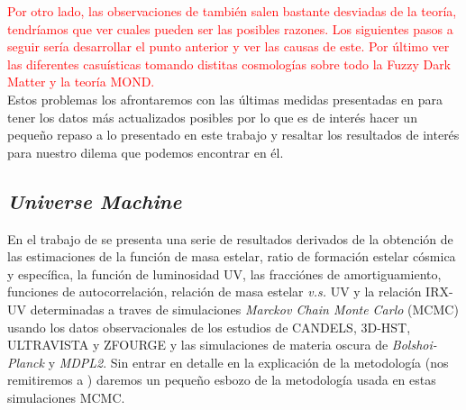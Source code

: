 \textcolor{red}{Por otro lado, las observaciones de \cite{hildebrandt2009cars} también salen bastante desviadas de la teoría, tendríamos que ver cuales pueden ser las posibles razones. Los siguientes pasos a seguir sería desarrollar el punto anterior y ver las causas de este. Por último ver las diferentes casuísticas tomando distitas cosmologías sobre todo la Fuzzy Dark Matter y la teoría MOND.}\\

Estos problemas los afrontaremos con las últimas medidas presentadas en \cite{behroozi2019universemachine} para tener los datos más actualizados posibles por lo que es de interés hacer un pequeño repaso a lo presentado en este trabajo y resaltar los resultados de interés para nuestro dilema que podemos encontrar en él.

\subsection{\textit{Universe Machine}}

En el trabajo de \cite{behroozi2019universemachine} se presenta una serie de resultados derivados de la obtención de las estimaciones de la función de masa estelar, ratio de formación estelar cósmica y específica, la función de luminosidad UV, las fracciónes de amortiguamiento, funciones de autocorrelación, relación de masa estelar \textit{v.s.} UV y la relación IRX-UV determinadas a traves de simulaciones \textit{Marckov Chain Monte Carlo} (MCMC) usando los datos observacionales de los estudios de CANDELS, 3D-HST, ULTRAVISTA y ZFOURGE y las simulaciones de materia oscura de \textit{Bolshoi-Planck} y \textit{MDPL2}. Sin entrar en detalle en la explicación de la metodología (nos remitiremos a \cite{behroozi2019universemachine}) daremos un pequeño esbozo de la metodología usada en estas simulaciones MCMC.\\

